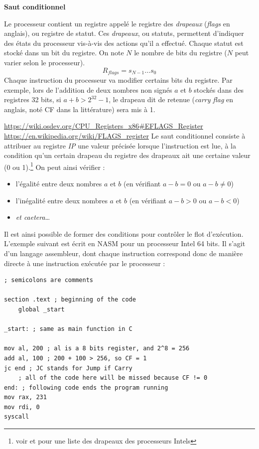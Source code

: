 \documentclass[../../../main.tex]{subfiles}
\begin{document}
\textbf{Saut conditionnel}
 
Le processeur contient un registre appelé le registre des \textit{drapeaux} (\textit{flags} en anglais), ou registre de statut. Ces \textit{drapeaux}, ou statuts, permettent d'indiquer des états du processeur vis-à-vis des actions qu'il a effectué. Chaque statut est stocké dans un bit du registre. On note $N$ le nombre de bits du registre ($N$ peut varier selon le processeur).
$$R_{flags} = s_{N-1}\dots s_{0}$$
Chaque instruction du processeur va modifier certains bits du registre. Par exemple, lors de l'addition de deux nombres non signés $a$ et $b$ stockés dans des registres 32 bits, si $a + b > 2^{32} - 1$, le drapeau dit de retenue (\textit{carry flag} en anglais, noté CF dans la littérature) sera mis à 1.
 
\urldef{\urlrflagsa}\url{https://wiki.osdev.org/CPU_Registers_x86#EFLAGS_Register}
\urldef{\urlrflagsb}\url{https://en.wikipedia.org/wiki/FLAGS_register}
Le saut conditionnel consiste à attribuer au registre \textit{IP} une valeur précisée lorsque l'instruction est lue, à la condition qu'un certain drapeau du registre des drapeaux ait une certaine valeur (0 ou 1).\footnote{voir \urlrflagsa et \urlrflagsb pour une liste des drapeaux des processeurs Intels} On peut ainsi vérifier :
\begin{itemize}
	\item l'égalité entre deux nombres $a$ et $b$ (en vérifiant $a - b = 0$ ou $a - b \neq{0}$)
	\item l'inégalité entre deux nombres $a$ et $b$ (en vérifiant $a - b > 0$ ou $a - b < 0$)
	\item \textit{et caetera}\dots
\end{itemize}
Il est ainsi possible de former des conditions pour contrôler le flot d'exécution. L'exemple suivant est écrit en NASM pour un processeur Intel 64 bits. Il s'agit d'un langage assembleur, dont chaque instruction correspond donc de manière directe à une instruction exécutée par le processeur :
\begin{verbatim}
; semicolons are comments

section .text ; beginning of the code
	global _start

_start: ; same as main function in C

mov al, 200 ; al is a 8 bits register, and 2^8 = 256
add al, 100 ; 200 + 100 > 256, so CF = 1
jc end ; JC stands for Jump if Carry
	; all of the code here will be missed because CF != 0
end: ; following code ends the program running
mov rax, 231
mov rdi, 0
syscall
\end{verbatim}
\end{document}
